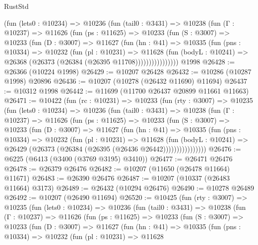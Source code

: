 \begin{lexlean}{RustStd}
\begin{coremodule}
          (fun (lets0 : @10234) =>
          @10236
            (fun (tail0 : @3431) =>
            @10238
              (fun (Γ : @10237) =>
              @11626
                (fun (ps : @11625) =>
                @10233
                  (fun (S : @3007) =>
                  @10233
                    (fun (D : @3007) =>
                    @11627
                      (fun (hn : @41) =>
                      @10335
                        (fun (pns : @10334) =>
                        @10232
                          (fun (pl : @10231) =>
                          @11628
                            (fun (bodyL : @10241) =>
                            @26368 (@26373 (@26384 (@26395 @11708))))))))))))))))
    @1998
@26428 := @26366 (@10224 @1998)
@26429 := @10207 @26428
@26432 := @10286 (@10287 @1998) @20896
@26436 := @10207 (@10278 (@26432 @11690) @11694)
@26437 := @10312 @1998
@26442 := @11699 (@11700 @26437 @20899 @11661 @11663)
@26471 := @10422
    (fun (rc : @10231) =>
    @10233
      (fun (rty : @3007) =>
      @10235
        (fun (lets0 : @10234) =>
        @10236
          (fun (tail0 : @3431) =>
          @10238
            (fun (Γ : @10237) =>
            @11626
              (fun (ps : @11625) =>
              @10233
                (fun (S : @3007) =>
                @10233
                  (fun (D : @3007) =>
                  @11627
                    (fun (hn : @41) =>
                    @10335
                      (fun (pns : @10334) =>
                      @10232
                        (fun (pl : @10231) =>
                        @11628
                          (fun (bodyL : @10241) =>
                          @26429 (@26373 (@26384 (@26395 (@26436 @26442))))))))))))))))
@26476 := @6225 (@6413 (@3400 (@3769 @3195) @3410))
@26477 := @26471 @26476
@26478 := @26379 @26476
@26482 := @10207 (@11650 (@26478 @11664) @11671)
@26483 := @26390 @26476
@26487 := @10207 (@10337 (@26483 @11664) @3173)
@26489 := @26432 (@10294 @26476)
@26490 := @10278 @26489
@26492 := @10207 (@26490 @11694)
@26520 := @10425
    (fun (rty : @3007) =>
    @10235
      (fun (lets0 : @10234) =>
      @10236
        (fun (tail0 : @3431) =>
        @10238
          (fun (Γ : @10237) =>
          @11626
            (fun (ps : @11625) =>
            @10233
              (fun (S : @3007) =>
              @10233
                (fun (D : @3007) =>
                @11627
                  (fun (hn : @41) =>
                  @10335
                    (fun (pns : @10334) =>
                    @10232
                      (fun (pl : @10231) =>
                      @11628

\end{coremodule}
\end{lexlean}
